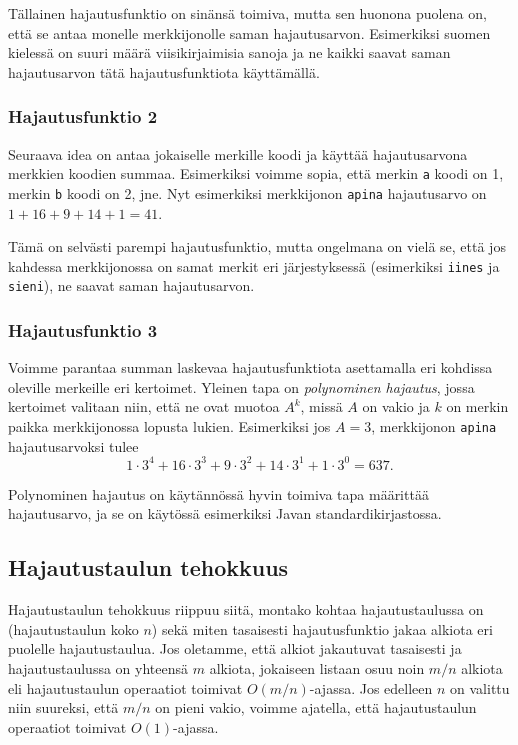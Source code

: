 Tällainen hajautusfunktio on sinänsä toimiva,
mutta sen huonona puolena on, että se antaa monelle
merkkijonolle saman hajautusarvon.
Esimerkiksi suomen kielessä on suuri määrä viisikirjaimisia
sanoja ja ne kaikki saavat saman hajautusarvon tätä
hajautusfunktiota käyttämällä.

\subsubsection{Hajautusfunktio 2}

Seuraava idea on antaa jokaiselle merkille koodi
ja käyttää hajautusarvona merkkien koodien summaa.
Esimerkiksi voimme sopia, että merkin \texttt{a}
koodi on 1, merkin \texttt{b} koodi on 2, jne.
Nyt esimerkiksi merkkijonon \texttt{apina} hajautusarvo
on $1+16+9+14+1=41$.

Tämä on selvästi parempi hajautusfunktio,
mutta ongelmana on vielä se, että jos kahdessa
merkkijonossa on samat merkit eri järjestyksessä
(esimerkiksi \texttt{iines} ja \texttt{sieni}),
ne saavat saman hajautusarvon.

\subsubsection{Hajautusfunktio 3}

Voimme parantaa summan laskevaa hajautusfunktiota
asettamalla eri kohdissa oleville merkeille eri kertoimet.
Yleinen tapa on \emph{polynominen hajautus},
jossa kertoimet valitaan niin, että ne ovat muotoa
$A^k$, missä $A$ on vakio ja $k$ on merkin paikka
merkkijonossa lopusta lukien.
Esimerkiksi jos $A=3$, merkkijonon \texttt{apina}
hajautusarvoksi tulee
\[ 1\cdot3^4+16\cdot3^3+9\cdot3^2+14\cdot3^1+1\cdot3^0 = 637.\]

Polynominen hajautus on käytännössä hyvin toimiva tapa
määrittää hajautusarvo, ja se on käytössä esimerkiksi
Javan standardikirjastossa.

\subsection{Hajautustaulun tehokkuus}

Hajautustaulun tehokkuus riippuu siitä, montako kohtaa
hajautustaulussa on (hajautustaulun koko $n$)
sekä miten tasaisesti hajautusfunktio jakaa alkiota
eri puolelle hajautustaulua.
Jos oletamme, että alkiot jakautuvat tasaisesti
ja hajautustaulussa on yhteensä $m$ alkiota,
jokaiseen listaan osuu noin $m/n$ alkiota
eli hajautustaulun operaatiot toimivat $O(m/n)$-ajassa.
Jos edelleen $n$ on valittu niin suureksi,
että $m/n$ on pieni vakio, voimme ajatella,
että hajautustaulun operaatiot toimivat $O(1)$-ajassa.


